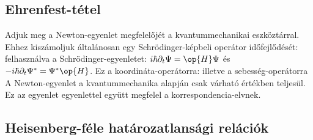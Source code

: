  \subsection{Ehrenfest-tétel}

   Adjuk meg a Newton-egyenlet megfelelőjét a kvantummechanikai eszköztárral.
   Ehhez kiszámoljuk általánosan egy Schrödinger-képbeli operátor időfejlődését:
   felhasználva a Schrödinger-egyenletet: $i\hbar\partial_t\Psi=\op{H}\Psi$ és $-i\hbar\partial_t\Psi^*=\Psi^*\op{H}$.
   Ez a koordináta-operátorra:
   illetve a sebesség-operátorra
   A Newton-egyenlet a kvantummechanika alapján csak várható értékben teljesül.
   Ez az egyenlet  egyenlettel együtt megfelel a korrespondencia-elvnek. 
   
  \subsection{Heisenberg-féle határozatlansági relációk}
   
